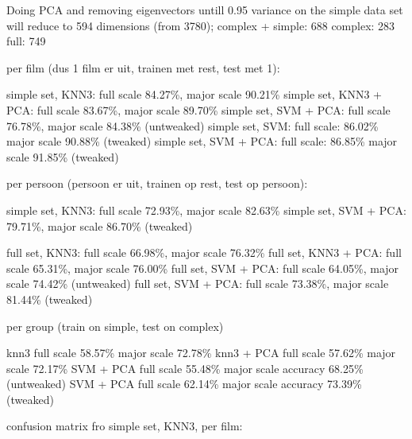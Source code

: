 Doing PCA and removing eigenvectors untill 0.95 variance on the simple data set will reduce to  594 dimensions (from 3780);
complex + simple: 688
complex:  283
full: 749


  per film (dus 1 film er uit, trainen met rest, test met 1):

simple set, KNN3: full scale 84.27\%, major scale 90.21\%
simple set, KNN3 + PCA: full scale 83.67\%, major scale 89.70\%
simple set, SVM + PCA: full scale 76.78\%, major scale 84.38\% (untweaked)
simple set, SVM: full scale: 86.02\% major scale 90.88\% (tweaked)
simple set, SVM + PCA: full scale: 86.85\% major scale 91.85\% (tweaked)

  per persoon (persoon er uit, trainen op rest, test op persoon):

simple set, KNN3: full scale 72.93\%, major scale 82.63\%
simple set, SVM + PCA: 79.71\%, major scale 86.70\% (tweaked)

full set, KNN3: full scale 66.98\%, major scale 76.32\%
full set, KNN3 + PCA: full scale 65.31\%, major scale 76.00\%
full set, SVM + PCA: full scale 64.05\%, major scale 74.42\% (untweaked)
full set, SVM + PCA: full scale 73.38\%, major scale 81.44\% (tweaked)

  per group (train on simple, test on complex)

knn3 full scale 58.57\% major scale 72.78\%
knn3 + PCA full scale 57.62\% major scale 72.17\%
SVM + PCA full scale 55.48\% major scale accuracy 68.25\% (untweaked)
SVM + PCA full scale 62.14\% major scale accuracy 73.39\% (tweaked)


confusion matrix fro simple set, KNN3, per film:

